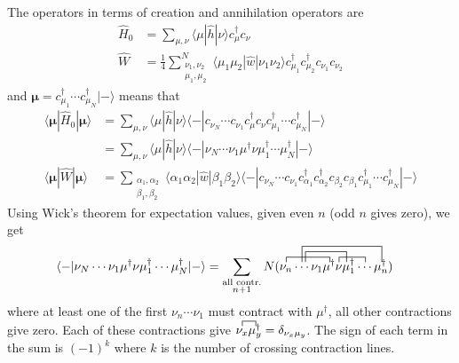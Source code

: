 \documentclass[12pt]{article}
\newcommand{\la}{\langle}
\newcommand{\ra}{\rangle}
\newcommand{\eq}[1]{{\begin{align*}#1\end{align*}}}
\renewcommand\vec[1]{\boldsymbol{\mathbf{#1}}} %
\newcommand{\op}[1]{\hat{#1}}
\newcommand{\da}{\dagger}
\begin{document}
\begin{tcolorbox}[title = Exercise 1.24. // Solution, breakable]
	The operators in terms of creation and annihilation operators are
    \eq{\op H_0 &= \sum_{\mu,\nu} \la \mu | \op h | \nu \ra c_\mu^\da c_\nu\\
    \op W &= \frac{1}{4}\sum_{\substack{\nu_1,\nu_2\\ \mu_1,\mu_2}}^{N}
    \la \mu_1\mu_2 | \op w | \nu_1\nu_2 \ra c_{\mu_1}^\da c_{\mu_2}^\da c_{\nu_1}c_{\nu_2}
    }
    and $\vec\mu = c^\da_{\mu_1}\cdots c^\da_{\mu_N}|-\ra$ means that
    \begin{align*}
	    \la \vec\mu | \op H_0 | \vec\mu \ra 
	    &= \sum_{\mu,\nu}\la \mu | \op h | \nu \ra
	        \la - | c_{\nu_N}\cdots c_{\nu_1}c_{\mu}^\da 
	        c_{\nu} c_{\mu_1}^\da\cdots c_{\mu_N}^\da| - \ra\\
	    &=\sum_{\mu,\nu}\la \mu | \op h | \nu \ra
	        \la - | \nu_N\cdots \nu_1\mu^\da 
	        \nu \mu_1^\da \cdots \mu_N^\da| - \ra\\
	    \la \vec\mu | \op W | \vec\mu \ra 
	    &= \sum_{\substack{\alpha_1,\alpha_2\\\beta_1,\beta_2}}
	        \la \alpha_1\alpha_2 | \op w | \beta_1\beta_2 \ra
	        \la - | c_{\nu_N}\cdots c_{\nu_1} c_{\alpha_1}^\da c_{\alpha_2}^\da
	        c_{\beta_2} c_{\beta_1} c_{\mu_1}^\da\cdots c_{\mu_N}^\da| - \ra
    \end{align*}
    Using Wick's theorem for expectation values, given even $n$ (odd $n$ gives zero),
    we get
    \begin{align*}
	    \la - | \nu_N\cdots \nu_1\mu^\da 
	        \nu \mu_1^\da \cdots \mu_N^\da| - \ra
	    &=\sum_{\substack{\text{all contr.}\\n+1}}
	    N(\contraction{}{\nu_n}{\cdots\nu_1}{\mu^\da}
	    \contraction[2ex]{\nu_n}{\cdots\nu}{\nu_1\mu^\da}{\nu}
	    \contraction{\nu_n\cdots\nu_1\mu^\da}{\nu}{\mu_1^\da}{\cdots}
	    \contraction[3ex]{\nu_n}{\cdots}{\nu_1\mu^\da\nu\mu_1^\da\cdots}{\mu_n^\da}
	    \nu_n\cdots\nu_1\mu^\da\nu\mu_1^\da\cdots\mu_n^\da)
    \end{align*}
    where at least one of the first $\nu_n\cdots\nu_1$ must contract with $\mu^\da$,
    all other contractions give zero.
    Each of these contractions give 
    $\contraction{}{\nu_x}{}{\mu_y^\da}\nu_x\mu_y^\da = \delta_{\nu_x\mu_y}$.
    The sign of each term in the sum is $(-1)^k$ where $k$ is the number of
    crossing contraction lines.
        

\end{tcolorbox}
\end{document}
